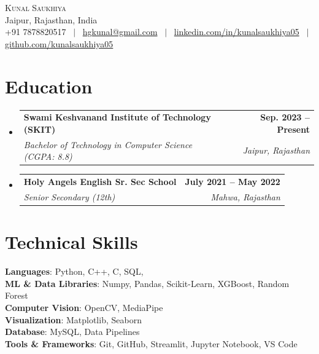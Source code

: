 \documentclass[letterpaper,11pt]{article}
\makeatletter
\newcommand{\resumeSubheading}[4]{
  \vspace{-2pt}\item
    \begin{tabular*}{1.0\textwidth}[t]{l@{\extracolsep{\fill}}r}
      \textbf{#1} & \textbf{\small #2} \\
      \textit{\small#3} & \textit{\small #4} \\
    \end{tabular*}\vspace{-5pt}
}
\newcommand{\resumeSubHeadingListStart}{\begin{itemize}[leftmargin=0.0in, label={}]}
\newcommand{\resumeSubHeadingListEnd}{\end{itemize}}
\makeatother
\begin{document}
\begin{center}
    {\Huge \scshape Kunal Saukhiya} \\ \vspace{2pt}
    Jaipur, Rajasthan, India \\ \vspace{2pt}
    \small +91 7878820517 ~$|$~
    \href{mailto:hgkunal@gmail.com}{hgkunal@gmail.com} ~$|$~
    \href{https://linkedin.com/in/kunalsaukhiya05}{linkedin.com/in/kunalsaukhiya05} ~$|$~
    \href{https://github.com/kunalsaukhiya05}{github.com/kunalsaukhiya05}
    \vspace{-4pt}
\end{center}

\section{Education}
  \resumeSubHeadingListStart
    \resumeSubheading
      {Swami Keshvanand Institute of Technology (SKIT)}{Sep. 2023 -- Present}
      {Bachelor of Technology in Computer Science (CGPA: 8.8)}{Jaipur, Rajasthan}
    \resumeSubheading
      {Holy Angels English Sr. Sec School}{July 2021 -- May 2022}
      {Senior Secondary (12th)}{Mahwa, Rajasthan}
  \resumeSubHeadingListEnd
  \vspace{-2pt}

\section{Technical Skills}
 \begin{itemize}[leftmargin=0.15in, label={}, itemsep=2pt]
    \small{\item{
     \textbf{Languages}{: Python, C++, C, SQL,} \\[2pt]
     \textbf{ML \& Data Libraries}{: Numpy, Pandas, Scikit-Learn, XGBoost, Random Forest} \\[2pt]
     \textbf{Computer Vision}{: OpenCV, MediaPipe} \\[2pt]
     \textbf{Visualization}{: Matplotlib, Seaborn} \\[2pt]
     \textbf{Database}{: MySQL, Data Pipelines} \\[2pt]
     \textbf{Tools \& Frameworks}{: Git, GitHub, Streamlit, Jupyter Notebook, VS Code}
    }}
 \end{itemize}
 \vspace{-4pt}
\end{document}
